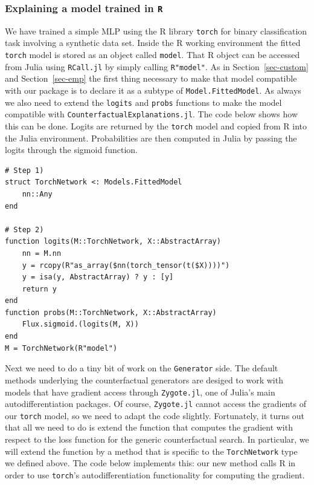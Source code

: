 \documentclass{juliacon}
\begin{document}
\hypertarget{explaining-a-model-trained-in-r}{%
\subsubsection{\texorpdfstring{Explaining a model trained in
\texttt{R}}{Explaining a model trained in R}}\label{explaining-a-model-trained-in-r}}

We have trained a simple MLP using the R library \texttt{torch} for
binary classification task involving a synthetic data set. Inside the R
working environment the fitted \texttt{torch} model is stored as an
object called \texttt{model}. That R object can be accessed from Julia
using \texttt{RCall.jl} by simply calling \texttt{R"model"}. As in
Section~\ref{sec-custom} and Section~\ref{sec-emp} the first thing
necessary to make that model compatible with our package is to declare
it as a subtype of \texttt{Model.FittedModel}. As always we also need to
extend the \texttt{logits} and \texttt{probs} functions to make the
model compatible with \texttt{CounterfactualExplanations.jl}. The code
below shows how this can be done. Logits are returned by the
\texttt{torch} model and copied from R into the Julia environment.
Probabilities are then computed in Julia by passing the logits through
the sigmoid function.

\begin{lstlisting}
# Step 1)
struct TorchNetwork <: Models.FittedModel
    nn::Any
end

# Step 2)
function logits(M::TorchNetwork, X::AbstractArray)
    nn = M.nn
    y = rcopy(R"as_array($nn(torch_tensor(t($X))))")
    y = isa(y, AbstractArray) ? y : [y]
    return y
end
function probs(M::TorchNetwork, X::AbstractArray)
    Flux.sigmoid.(logits(M, X))
end
M = TorchNetwork(R"model")
\end{lstlisting}

Next we need to do a tiny bit of work on the \texttt{Generator} side.
The default methods underlying the counterfactual generators are desiged
to work with models that have gradient access through
\texttt{Zygote.jl}, one of Julia's main autodifferentiation packages. Of
course, \texttt{Zygote.jl} cannot access the gradients of our
\texttt{torch} model, so we need to adapt the code slightly.
Fortunately, it turns out that all we need to do is extend the function
that computes the gradient with respect to the loss function for the
generic counterfactual search. In particular, we will extend the
function by a method that is specific to the \texttt{TorchNetwork} type
we defined above. The code below implements this: our new method calls R
in order to use \texttt{torch}'s autodifferentiation functionality for
computing the gradient.
\end{document}
